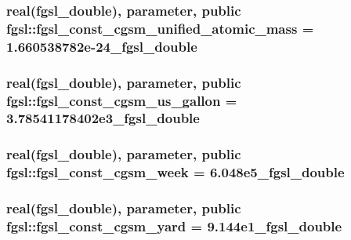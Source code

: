 \subsubsection[{fgsl\+\_\+const\+\_\+cgsm\+\_\+unified\+\_\+atomic\+\_\+mass}]{\setlength{\rightskip}{0pt plus 5cm}real({\bf fgsl\+\_\+double}), parameter, public fgsl\+::fgsl\+\_\+const\+\_\+cgsm\+\_\+unified\+\_\+atomic\+\_\+mass = 1.\+660538782e-\/24\+\_\+fgsl\+\_\+double}\label{namespacefgsl_a6b7f3fbb6b2b1c225cab4719706b6d59}
\hypertarget{namespacefgsl_a9fdaf0160e636b5a341738f1038e6671}{}
\subsubsection[{fgsl\+\_\+const\+\_\+cgsm\+\_\+us\+\_\+gallon}]{\setlength{\rightskip}{0pt plus 5cm}real({\bf fgsl\+\_\+double}), parameter, public fgsl\+::fgsl\+\_\+const\+\_\+cgsm\+\_\+us\+\_\+gallon = 3.\+78541178402e3\+\_\+fgsl\+\_\+double}\label{namespacefgsl_a9fdaf0160e636b5a341738f1038e6671}
\hypertarget{namespacefgsl_ab1a6fad27f87e45e6de1d5b58d7b86fc}{}
\subsubsection[{fgsl\+\_\+const\+\_\+cgsm\+\_\+week}]{\setlength{\rightskip}{0pt plus 5cm}real({\bf fgsl\+\_\+double}), parameter, public fgsl\+::fgsl\+\_\+const\+\_\+cgsm\+\_\+week = 6.\+048e5\+\_\+fgsl\+\_\+double}\label{namespacefgsl_ab1a6fad27f87e45e6de1d5b58d7b86fc}
\hypertarget{namespacefgsl_a3f40255d359411c5789f360fd7c2961e}{}
\subsubsection[{fgsl\+\_\+const\+\_\+cgsm\+\_\+yard}]{\setlength{\rightskip}{0pt plus 5cm}real({\bf fgsl\+\_\+double}), parameter, public fgsl\+::fgsl\+\_\+const\+\_\+cgsm\+\_\+yard = 9.\+144e1\+\_\+fgsl\+\_\+double}\label{namespacefgsl_a3f40255d359411c5789f360fd7c2961e}
\hypertarget{namespacefgsl_a58e85d8e8be547abd415a03ac8cfe6d9}{}
